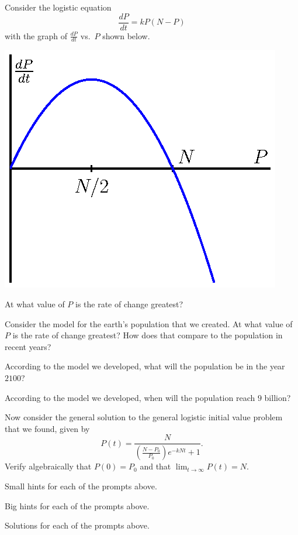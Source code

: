 \begin{activity} \label{A:7.6.2}  
  Consider the logistic equation
  $$ \frac{dP}{dt} = kP(N-P) $$
  with the graph of $\frac{dP}{dt}$ vs.~$P$ shown below.
  \begin{center}
    \includegraphics{figures/7_6_activity_2.eps}
  \end{center}
\ba
\item At what value of $P$ is the rate of change greatest?

\item Consider the model for the earth's population that we created.
  At what value of $P$ is the rate of change greatest?  How does that
  compare to the population in recent years?

\item According to the model we developed, what will the population be
  in the year $2100$?

\item According to the model we developed, when will the population
  reach $9$ billion?

\item Now consider the general solution to the general logistic initial value problem that
  we found, given by
  $$
  P(t) = \frac{N}{\left(\frac{N-P_0}{P_0}\right)e^{-kNt} + 1}.
  $$
  Verify algebraically that $P(0) = P_0$ and that $\lim_{t\to\infty} P(t) = N$.

\ea
\end{activity}
\begin{smallhint}
\ba
	\item Small hints for each of the prompts above.
\ea
\end{smallhint}
\begin{bighint}
\ba
	\item Big hints for each of the prompts above.
\ea
\end{bighint}
\begin{activitySolution}
\ba
	\item Solutions for each of the prompts above.
\ea
\end{activitySolution}
\aftera